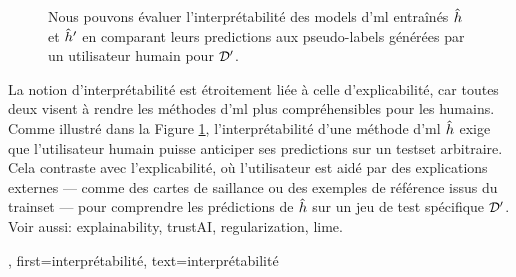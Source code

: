 {{\begin{figure}
\begin{center}
				\caption{Nous pouvons évaluer l’interprétabilité des \glspl{model} d'\gls{ml} entraînés 
					$\hat{h}$ et $\hat{h}'$ en comparant leurs \glspl{prediction} aux pseudo-\glspl{label} générées par un utilisateur humain pour $\mathcal{D}'$. 
					\label{fig_aug_simulatability_dict}}
			\end{center}
		\end{figure}
		La notion d’interprétabilité est étroitement liée à celle d’explicabilité,  
		car toutes deux visent à rendre les méthodes d'\gls{ml} plus compréhensibles pour les humains.  
		Comme illustré dans la Figure \ref{fig_aug_simulatability_dict}, l’interprétabilité d’une méthode d'\gls{ml}  
		$\hat{h}$ exige que l’utilisateur humain puisse anticiper ses \glspl{prediction}  
		sur un \gls{testset} arbitraire. Cela contraste avec l’explicabilité, où l’utilisateur est aidé par  
		des explications externes — comme des cartes de saillance ou des exemples de référence issus du \gls{trainset} —  
		pour comprendre les prédictions de $\hat{h}$ sur un jeu de test spécifique $\mathcal{D}'$. \\
		Voir aussi: \gls{explainability}, \gls{trustAI}, \gls{regularization}, \gls{lime}.},
	first={interprétabilité},
	text={interprétabilité}
}

